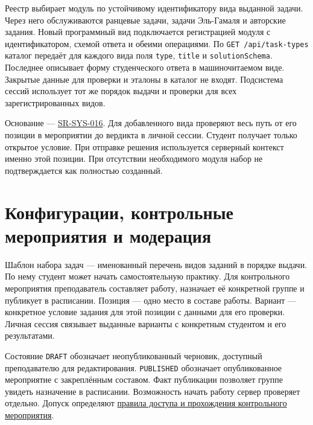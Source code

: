 \documentclass[12pt,a4paper]{article}
\begin{document}
Реестр выбирает модуль по устойчивому идентификатору вида выданной задачи. Через него обслуживаются ранцевые задачи, задачи Эль-Гамаля и авторские задания. Новый программный вид подключается регистрацией модуля с идентификатором, схемой ответа и обеими операциями. По \texttt{GET /\allowbreak{}api/\allowbreak{}task-\allowbreak{}types} каталог передаёт для каждого вида поля \texttt{type}, \texttt{title} и \texttt{solution\allowbreak{}Schema}. Последнее описывает форму студенческого ответа в машиночитаемом виде. Закрытые данные для проверки и эталоны в каталог не входят. Подсистема сессий использует тот же порядок выдачи и проверки для всех зарегистрированных видов.

Основание --- {\href{../04\_Системные\_требования/DOC-05\_Системные\_требования.pdf\#sr-sys-016}{SR-SYS-016}}. Для добавленного вида проверяют весь путь от его позиции в мероприятии до вердикта в личной сессии. Студент получает только открытое условие. При отправке решения используется серверный контекст именно этой позиции. При отсутствии необходимого модуля набор не подтверждается как полностью созданный.

\section{Конфигурации, контрольные мероприятия и модерация}\label{ux43aux43eux43dux444ux438ux433ux443ux440ux430ux446ux438ux438-ux43aux43eux43dux442ux440ux43eux43bux44cux43dux44bux435-ux43cux435ux440ux43eux43fux440ux438ux44fux442ux438ux44f-ux438-ux43cux43eux434ux435ux440ux430ux446ux438ux44f}

\hypertarget{конфигурации-контрольные-мероприятия-и-модерация}{}

Шаблон набора задач --- именованный перечень видов заданий в порядке выдачи. По нему студент может начать самостоятельную практику. Для контрольного мероприятия преподаватель составляет работу, назначает её конкретной группе и публикует в расписании. Позиция --- одно место в составе работы. Вариант --- конкретное условие задания для этой позиции с данными для его проверки. Личная сессия связывает выданные варианты с конкретным студентом и его результатами.

Состояние \texttt{DRAFT} обозначает неопубликованный черновик, доступный преподавателю для редактирования. \texttt{PUBLISHED} обозначает опубликованное мероприятие с закреплённым составом. Факт публикации позволяет группе увидеть назначение в расписании. Возможность начать работу сервер проверяет отдельно. Допуск определяют {\href{../02\_Техническое\_задание/DOC-02\_Техническое\_задание.pdf\#правила-доступа-и-прохождения-контрольного-мероприятия}{правила доступа и прохождения контрольного мероприятия}}.
\end{document}
